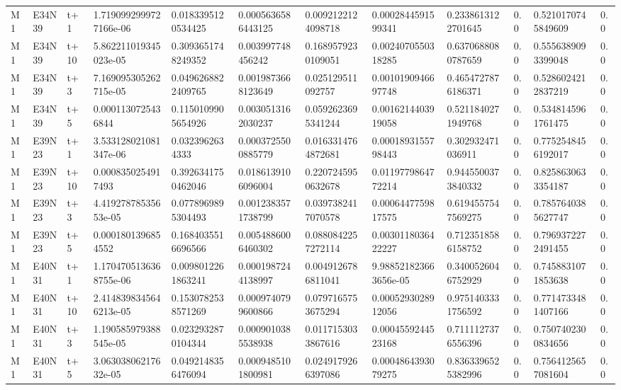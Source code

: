 \begin{landscape}
\begin{longtable}{llllllllllll}
M1 & E34N39 & t+1 & 1.7190992999727166e-06 & 0.0183395120534425 & 0.0005636586443125 & 0.0092122124098718 & 0.0002844591599341 & 0.2338613122701645 & 0.0 & 0.5210170745849609 & 0.0 \\
M1 & E34N39 & t+10 & 5.862211019345023e-05 & 0.3093651748249352 & 0.003997748456242 & 0.1689579230109051 & 0.0024070550318285 & 0.6370688080787659 & 0.0 & 0.5556389093399048 & 0.0 \\
M1 & E34N39 & t+3 & 7.169095305262715e-05 & 0.0496268822409765 & 0.0019873668123649 & 0.025129511092757 & 0.0010190946697748 & 0.4654727876186371 & 0.0 & 0.5286024212837219 & 0.0 \\
M1 & E34N39 & t+5 & 0.0001130725436844 & 0.1150109905654926 & 0.0030513162030237 & 0.0592623695341244 & 0.0016214403919058 & 0.5211840271949768 & 0.0 & 0.5348145961761475 & 0.0 \\
M1 & E39N23 & t+1 & 3.533128021081347e-06 & 0.0323962634333 & 0.0003725500885779 & 0.0163314764872681 & 0.0001893155798443 & 0.302932471036911 & 0.0 & 0.7752548456192017 & 0.0 \\
M1 & E39N23 & t+10 & 0.0008350254917493 & 0.3926341750462046 & 0.0186139106096004 & 0.2207245950632678 & 0.0119779864772214 & 0.9445500373840332 & 0.0 & 0.8258630633354187 & 0.0 \\
M1 & E39N23 & t+3 & 4.41927878535653e-05 & 0.0778969895304493 & 0.0012383571738799 & 0.0397382417070578 & 0.0006447759817575 & 0.6194557547569275 & 0.0 & 0.7857640385627747 & 0.0 \\
M1 & E39N23 & t+5 & 0.0001801396854552 & 0.1684035516696566 & 0.0054886006460302 & 0.0880842257272114 & 0.0030118036422227 & 0.7123518586158752 & 0.0 & 0.7969372272491455 & 0.0 \\
M1 & E40N31 & t+1 & 1.1704705136368755e-06 & 0.0098012261863241 & 0.0001987244138997 & 0.0049126786811041 & 9.988521823663656e-05 & 0.3400526046752929 & 0.0 & 0.7458831071853638 & 0.0 \\
M1 & E40N31 & t+10 & 2.4148398345646213e-05 & 0.1530782538571269 & 0.0009740799600866 & 0.0797165753675294 & 0.0005293028912056 & 0.9751403331756592 & 0.0 & 0.7714733481407166 & 0.0 \\
M1 & E40N31 & t+3 & 1.190585979388545e-05 & 0.0232932870104344 & 0.0009010385538938 & 0.0117153033867616 & 0.0004559244523168 & 0.7111127376556396 & 0.0 & 0.7507402300834656 & 0.0 \\
M1 & E40N31 & t+5 & 3.06303806217632e-05 & 0.0492148356476094 & 0.0009485101800981 & 0.0249179266397086 & 0.0004864393079275 & 0.8363396525382996 & 0.0 & 0.7564125657081604 & 0.0 \\

\end{longtable}
\end{landscape}
